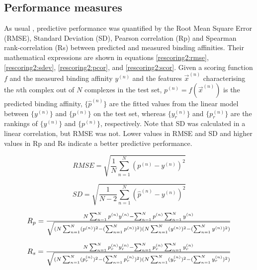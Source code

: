 \documentclass[twocolumn]{bmcart}
\begin{document}
\subsection*{Performance measures}

As usual \cite{1313}, predictive performance was quantified by the Root Mean Square Error (RMSE), Standard Deviation (SD), Pearson correlation (Rp) and Spearman rank-correlation (Rs) between predicted and measured binding affinities. Their mathematical expressions are shown in equations \ref{rescoring2:rmse}, \ref{rescoring2:sdev}, \ref{rescoring2:pcor}, and \ref{rescoring2:scor}. Given a scoring function $f$ and the measured binding affinity $y^{(n)}$ and the features $\overrightarrow{x}^{(n)}$ characterising the $n$th complex out of $N$ complexes in the test set, $p^{(n)}=f(\overrightarrow{x}^{(n)})$ is the predicted binding affinity, $\{\hat{p}^{(n)}\}$ are the fitted values from the linear model between $\{y^{(n)}\}$ and $\{p^{(n)}\}$ on the test set, whereas $\{y_r^{(n)}\}$ and $\{p_r^{(n)}\}$ are the rankings of $\{y^{(n)}\}$ and $\{p^{(n)}\}$, respectively. Note that SD was calculated in a linear correlation, but RMSE was not. Lower values in RMSE and SD and higher values in Rp and Rs indicate a better predictive performance.

\begin{equation}
RMSE = \sqrt{\frac{1}{N}\sum_{n=1}^N(p^{(n)}-y^{(n)})^2}
\label{rescoring2:rmse}
\end{equation}

\begin{equation}
SD = \sqrt{\frac{1}{N-2}\sum_{n=1}^N(\hat{p}^{(n)}-y^{(n)})^2}
\label{rescoring2:sdev}
\end{equation}

\begin{equation}
\resizebox{.85\hsize}{!}{$R_p = \frac{N\sum_{n=1}^Np^{(n)}y^{(n)}-\sum_{n=1}^Np^{(n)}\sum_{n=1}^Ny^{(n)}}{\sqrt{(N\sum_{n=1}^N(p^{(n)})^2-(\sum_{n=1}^Np^{(n)})^2)(N\sum_{n=1}^N(y^{(n)})^2-(\sum_{n=1}^Ny^{(n)})^2)}}$}
\label{rescoring2:pcor}
\end{equation}

\begin{equation}
\resizebox{.85\hsize}{!}{$R_s = \frac{N\sum_{n=1}^Np_r^{(n)}y_r^{(n)}-\sum_{n=1}^Np_r^{(n)}\sum_{n=1}^Ny_r^{(n)}}{\sqrt{(N\sum_{n=1}^N(p_r^{(n)})^2-(\sum_{n=1}^Np_r^{(n)})^2)(N\sum_{n=1}^N(y_r^{(n)})^2-(\sum_{n=1}^Ny_r^{(n)})^2)}}$}
\label{rescoring2:scor}
\end{equation}
\end{document}
